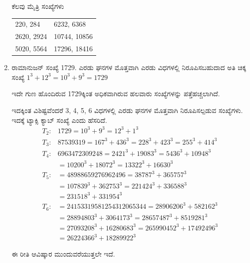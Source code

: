 \begin{enumerate}
\vskip 0.1cm

ಕೆಲವು ಮೈತ್ರಿ ಸಂಖ್ಯೆಗಳು 

\begin{tabular}[t]{ll}
220, 284 & 6232, 6368\\
2620, 2924 & 10744, 10856\\
5020, 5564 & 17296, 18416
\end{tabular}

\item ರಾಮಾನುಜನ್ ಸಂಖ್ಯೆ  1729. ಎರಡು ಘನಗಳ ಮೊತ್ತವಾಗಿ ಎರಡು ವಿಧಗಳಲ್ಲಿ ನಿರೂಪಿಸಬಹುದಾದ ಅತಿ ಚಿಕ್ಕ ಸಂಖ್ಯೆ  $1^{3} + 12^{3} = 10^{3} + 9^{3} = 1729$

ಇದೇ ಗುಣ ಹೊಂದಿರುವ 1729ಕ್ಕಿಂತ ಅಧಿಕವಾಗಿರುವ ಹಲವಾರು ಸಂಖ್ಯೆಗಳನ್ನು ಪತ್ತೆಹಚ್ಚಲಾಗಿದೆ. 

\vskip 0.1cm

{\fontsize{10}{12}}

\vskip 0.1cm

ಇದಕ್ಕಿಂತ ವಿಶಿಷ್ಟವೆಂದರೆ 3, 4, 5, 6 ವಿಧಗಳಲ್ಲಿ ಎರಡು ಘನಗಳ ಮೊತ್ತವಾಗಿ ನಿರೂಪಿಸಲ್ಪಡುವ ಸಂಖ್ಯೆಗಳು. ಇದಕ್ಕೆ ಟ್ಯಾಕ್ಸಿ ಕ್ಯಾಬ್ ಸಂಖ್ಯೆ ಎಂದು ಹೆಸರಿದೆ.
\begin{align*}
T_{2} : & 1729 = 10^{3} + 9^{3} = 12^{3} + 1^{3}\\[0.1cm]
T_{3} : & 87539319 = 167^{3} + 436^{3} = 228^{3} + 423^{3} = 255^{3} + 414^{3}\\[0.1cm]
T_{4} : & 6963472309248 = 2421^{3} + 19083^{3} = 5436^{3} + 10948^{3}\\[0.1cm]
& = 10200^{3} + 18072^{3} = 13322^{3} + 16630^{3}\\[0.1cm]
T_{5} : & = 48988659276962496 = 38787^{3} + 365757^{3}\\[0.1cm] 
& = 107839^{3} + 362753^{3} = 221424^{3} + 336588^{3}\\[0.1cm]
& = 231518^{3} + 331954^{3}\\[0.1cm]
T_{6} : & = 24153319581254312065344= 28906206^{3} + 582162^{3}\\[0.1cm]
& = 28894803^{3} + 3064173^{3} = 28657487^{3} + 8519281^{3}\\[0.1cm]
& = 27093208^{3} + 16280683^{3} = 265990452^{3} + 17492496^{3}\\[0.1cm]
& = 26224366^{3} + 18289922^{3}
\end{align*}

ಈ ರೀತಿ ಆವಿಷ್ಕಾರ ಮುಂದುವರೆಯುತ್ತಲೇ ಇದೆ. 
\end{enumerate}

